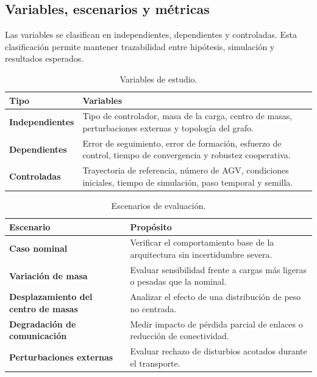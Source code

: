 \documentclass[12pt,a4paper]{article}
\begin{document}
\subsection{Variables, escenarios y métricas}

Las variables se clasifican en independientes, dependientes y controladas. Esta clasificación permite mantener trazabilidad entre hipótesis, simulación y resultados esperados.

\begin{table}[htbp]
\centering
\caption{Variables de estudio.}
\begin{tabularx}{\textwidth}{>{\bfseries}p{}Y}
\toprule
Tipo & Variables \\
\midrule
Independientes & Tipo de controlador, masa de la carga, centro de masas, perturbaciones externas y topología del grafo. \\
Dependientes & Error de seguimiento, error de formación, esfuerzo de control, tiempo de convergencia y robustez cooperativa. \\
Controladas & Trayectoria de referencia, número de AGV, condiciones iniciales, tiempo de simulación, paso temporal y semilla. \\
\bottomrule
\end{tabularx}
\end{table}

\begin{table}[htbp]
\centering
\caption{Escenarios de evaluación.}
\begin{tabularx}{\textwidth}{>{\bfseries}p{}Y}
\toprule
Escenario & Propósito \\
\midrule
Caso nominal & Verificar el comportamiento base de la arquitectura sin incertidumbre severa. \\
Variación de masa & Evaluar sensibilidad frente a cargas más ligeras o pesadas que la nominal. \\
Desplazamiento del centro de masas & Analizar el efecto de una distribución de peso no centrada. \\
Degradación de comunicación & Medir impacto de pérdida parcial de enlaces o reducción de conectividad. \\
Perturbaciones externas & Evaluar rechazo de disturbios acotados durante el transporte. \\
\bottomrule
\end{tabularx}
\end{table}
\end{document}

